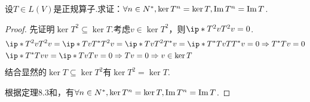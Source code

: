\begin{problem}[17]\label{7.A.17}
    设\(T \in L(V)\)是正规算子.求证：\(\forall n \in N^*,\ker T^n=\ker T,\operatorname{Im} T^n=\operatorname{Im} T\).
\end{problem}

\begin{proof}
    先证明\(\ker T^2 \subseteq \ker T\).考虑\(v \in \ker T^2\)，则\(\ip*{T^2 v}{T^2 v}=0\).
    \begin{align*}
        &\ip*{T^2 v}{T^2 v}=\ip*{Tv}{T^*T^2v}=\ip*{Tv}{T^2T^*v}=\ip*{T^*Tv}{TT^*v}=0 \Rightarrow T^*Tv=0 \\
        &\ip*{T^*Tv}{v}=\ip*{Tv}{Tv}=0 \Rightarrow Tv=0 \Rightarrow v \in \ker T
    \end{align*}
    结合显然的\(\ker T \subseteq \ker T^2\)有\(\ker T^2=\ker T\).

    根据定理8.3和，有\(\forall n \in N^*,\ker T^n=\ker T,\operatorname{Im} T^n=\operatorname{Im} T\).
\end{proof}

